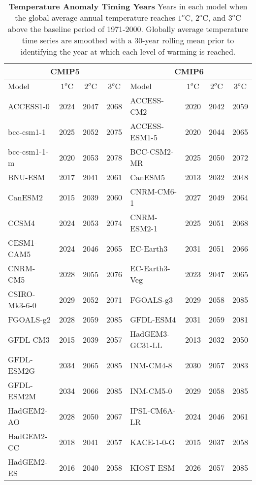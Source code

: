 \documentclass[]{scrartcl}
\begin{document}
\begin{table}[ht!]
	\caption{\textbf{Temperature Anomaly Timing Years} Years in each model when the global average annual temperature reaches  $1^o$C, $2^o$C, and $3^o$C above the baseline period of 1971-2000. Globally average temperature time series are smoothed with a 30-year rolling mean prior to identifying the year at which each level of warming is reached.} \label{table:cmip_anom_timing}
	\begin{center}
		\begin{tabular}{|l|c|c|c|l|c|c|c|}
			\hline
			\multicolumn{4}{|c|}{\textbf{CMIP5}} & \multicolumn{4}{|c|}{\textbf{CMIP6}} \\
			\hline
			Model  & $1^o$C & $2^o$C & $3^o$C & Model  & $1^o$C & $2^o$C & $3^o$C \\
			\hline
			ACCESS1-0 & 2024 & 2047 & 2068 & ACCESS-CM2 & 2020 & 2042 & 2059 \\ 
			bcc-csm1-1 & 2025 & 2052 & 2075 & ACCESS-ESM1-5 & 2020 & 2044 & 2065 \\ 
			bcc-csm1-1-m & 2020 & 2053 & 2078 & BCC-CSM2-MR & 2025 & 2050 & 2072 \\ 
			BNU-ESM & 2017 & 2041 & 2061 & CanESM5 & 2013 & 2032 & 2048 \\ 
			CanESM2 & 2015 & 2039 & 2060 & CNRM-CM6-1 & 2027 & 2049 & 2064 \\ 
			CCSM4 & 2024 & 2053 & 2074 & CNRM-ESM2-1 & 2025 & 2051 & 2068 \\ 
			CESM1-CAM5 & 2024 & 2046 & 2065 & EC-Earth3 & 2031 & 2051 & 2066 \\ 
			CNRM-CM5 & 2028 & 2055 & 2076 & EC-Earth3-Veg & 2023 & 2047 & 2065 \\ 
			CSIRO-Mk3-6-0 & 2029 & 2052 & 2071 & FGOALS-g3 & 2029 & 2058 & 2085 \\ 
			FGOALS-g2 & 2028 & 2059 & 2085 & GFDL-ESM4 & 2031 & 2059 & 2081 \\ 
			GFDL-CM3 & 2015 & 2039 & 2057 & HadGEM3-GC31-LL & 2013 & 2032 & 2050 \\ 
			GFDL-ESM2G & 2034 & 2065 & 2085 & INM-CM4-8 & 2030 & 2057 & 2083 \\ 
			GFDL-ESM2M & 2034 & 2066 & 2085 & INM-CM5-0 & 2029 & 2058 & 2085 \\ 
			HadGEM2-AO & 2028 & 2050 & 2067 & IPSL-CM6A-LR & 2024 & 2046 & 2061 \\ 
			HadGEM2-CC & 2018 & 2041 & 2057 & KACE-1-0-G & 2015 & 2037 & 2058 \\ 
			HadGEM2-ES & 2016 & 2040 & 2058 & KIOST-ESM & 2026 & 2057 & 2085 \\ 

\end{tabular}
\end{center}
\end{table}
\end{document}
